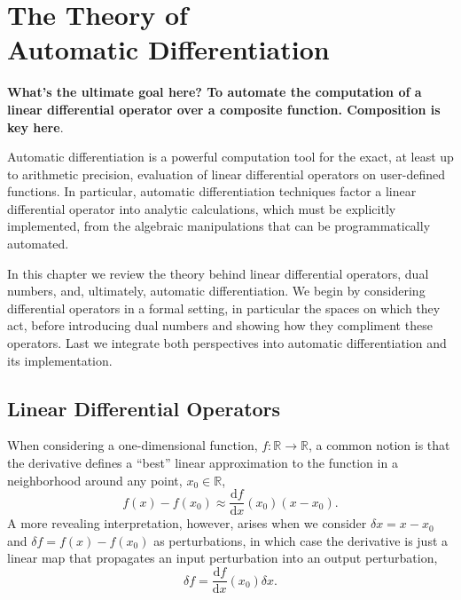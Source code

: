 \chapter{The Theory of \\ Automatic Differentiation}

\textbf{What's the ultimate goal here?  To automate the computation of a linear
differential operator over a composite function.  Composition is key here}.

Automatic differentiation is a powerful computation tool for the exact, at least up to 
arithmetic precision, evaluation of linear differential operators on user-defined functions.  
In particular, automatic differentiation techniques factor a linear differential operator into 
analytic calculations, which must be explicitly implemented, from the algebraic 
manipulations that can be programmatically automated.

In this chapter we review the theory behind linear differential operators, dual numbers,
and, ultimately, automatic differentiation.  We begin by considering differential operators
in a formal setting, in particular the spaces on which they act, before introducing dual
numbers and showing how they compliment these operators.  Last we integrate both
perspectives into automatic differentiation and its implementation.

\section{Linear Differential Operators}

When considering a one-dimensional function, $f : \mathbb{R} \rightarrow \mathbb{R}$, 
a common notion is that the derivative defines a ``best'' linear approximation
to the function in a neighborhood around any point, $x_{0} \in \mathbb{R}$,
%
\begin{equation*}
f \! \left( x \right) - f \! \left( x_{0} \right)
\approx \frac{ \mathrm{d} f }{ \mathrm{d} x } \! \left( x_{0} \right) \left( x - x_{0} \right).
\end{equation*}
%
A more revealing interpretation, however, arises when we consider
$\delta x = x - x_{0}$ and $\delta f = f \! \left( x \right) - f \! \left( x_{0} \right)$ as
perturbations, in which case the derivative is just a linear map that propagates
an input perturbation into an output perturbation,
%
\begin{equation*}
\delta f = \frac{ \mathrm{d} f }{ \mathrm{d} x } \! \left( x_{0} \right) \delta x.
\end{equation*}

